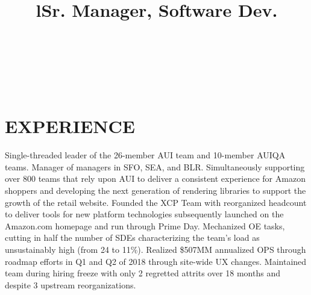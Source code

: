 \documentclass[margin]{res}
\begin{document}
\bigskip

\address{2528 Chilton Way\\ken@hero.net}
\address{Berkeley, CA 94704\\(310) 383-7981}

\begin{resume}

\begin{format}
\title{l}\\
\\
\body\\
\end{format}

\section{EXPERIENCE}

\title{\textbf{Sr. Manager, Software Dev.}}
\begin{position}
\hspace*{.5cm}Single-threaded leader of the 26-member AUI team and 10-member AUIQA teams. Manager of managers in SFO, SEA, and BLR. Simultaneously supporting over 800 teams that rely upon AUI to deliver a consistent experience for Amazon shoppers and developing the next generation of rendering libraries to support the growth of the retail website. Founded the XCP Team with reorganized headcount to deliver tools for new platform technologies subsequently launched on the Amazon.com homepage and run through Prime Day. Mechanized OE tasks, cutting in half the number of SDEs characterizing the team's load as unsustainably high (from 24 to 11\%). Realized \$507MM annualized OPS through roadmap efforts in Q1 and Q2 of 2018 through site-wide UX changes. Maintained team during hiring freeze with only 2 regretted attrits over 18 months and despite 3 upstream reorganizations. 
\end{position}


\end{resume}
\end{document}
